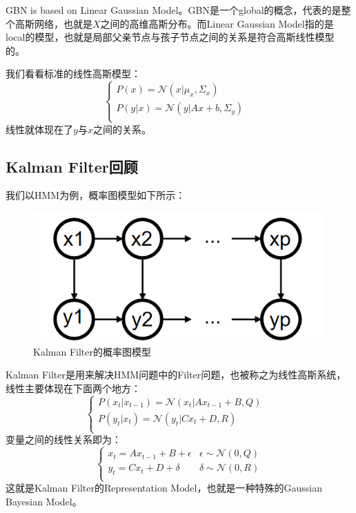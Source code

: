 \documentclass[a4paper]{article}
\begin{document}
{\color{red} GBN is based on Linear Gaussian Model}。GBN是一个global的概念，代表的是整个高斯网络，也就是$X$之间的高维高斯分布。而Linear Gaussian Model指的是local的模型，也就是局部父亲节点与孩子节点之间的关系是符合高斯线性模型的。

我们看看标准的线性高斯模型：
\begin{equation}
    \left\{
    \begin{array}{ll}
      P(x) = \mathcal{N}(x|\mu_x,\Sigma_x) & \\
      P(y|x) = \mathcal{N}(y|Ax+b,\Sigma_y) & \\
    \end{array}
    \right.
\end{equation}
线性就体现在了$y$与$x$之间的关系。

\subsection{Kalman Filter回顾}
我们以HMM为例，概率图模型如下所示：
\begin{figure}[H]
    \centering
    \includegraphics[width=.38\textwidth]{微信图片_20200226202312.png}
    \caption{Kalman Filter的概率图模型}
    \label{fig:my_label_1}
\end{figure}
Kalman Filter是用来解决HMM问题中的Filter问题，也被称之为线性高斯系统，线性主要体现在下面两个地方：
\begin{equation}
    \left\{
    \begin{array}{ll}
      P(x_t|x_{t-1}) = \mathcal{N}(x_t|Ax_{t-1}+B,Q) & \\
      P(y_t|x_t) = \mathcal{N}(y_t|Cx_t+D,R) & \\
    \end{array}
    \right.
\end{equation}
变量之间的线性关系即为：
\begin{equation}
    \left\{
    \begin{array}{ll}
      x_t = Ax_{t-1} + B + \epsilon & \epsilon\sim \mathcal{N}(0,Q) \\
      y_t = Cx_{t} + D + \delta & \delta \sim \mathcal{N}(0,R) \\
    \end{array}
    \right.
\end{equation}
这就是Kalman Filter的Representation Model，也就是一种特殊的Gaussian Bayesian Model。
\end{document}
